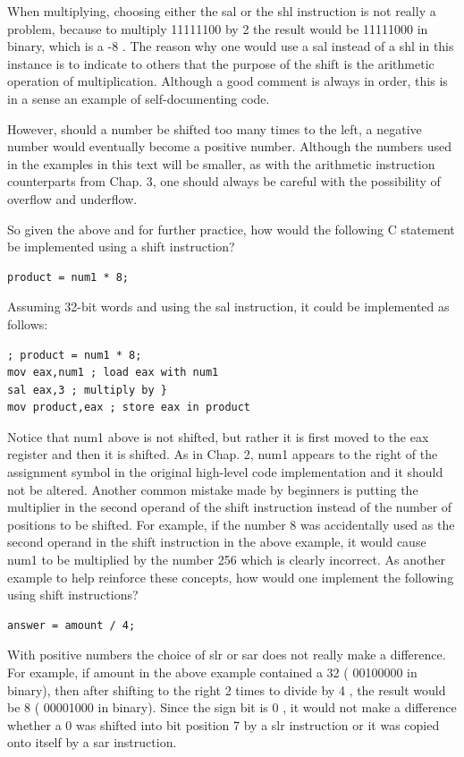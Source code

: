 \documentclass[10pt]{book}
\begin{document}
When multiplying, choosing either the sal or the shl instruction is not really a problem, because to multiply 11111100 by 2 the result would be 11111000 in binary, which is a -8 . The reason why one would use a sal instead of a shl in this instance is to indicate to others that the purpose of the shift is the arithmetic operation of multiplication. Although a good comment is always in order, this is in a sense an example of self-documenting code.

However, should a number be shifted too many times to the left, a negative number would eventually become a positive number. Although the numbers used in the examples in this text will be smaller, as with the arithmetic instruction counterparts from Chap. 3, one should always be careful with the possibility of overflow and underflow.

So given the above and for further practice, how would the following C statement be implemented using a shift instruction?

\begin{verbatim}
product = num1 * 8;
\end{verbatim}

Assuming 32-bit words and using the sal instruction, it could be implemented as follows:

\begin{verbatim}
; product = num1 * 8;
mov eax,num1 ; load eax with num1
sal eax,3 ; multiply by }
mov product,eax ; store eax in product
\end{verbatim}

Notice that num1 above is not shifted, but rather it is first moved to the eax register and then it is shifted. As in Chap. 2, num1 appears to the right of the assignment symbol in the original high-level code implementation and it should not be altered. Another common mistake made by beginners is putting the multiplier in the second operand of the shift instruction instead of the number of positions to be shifted. For example, if the number 8 was accidentally used as the second operand in the shift instruction in the above example, it would cause num1 to be multiplied by the number 256 which is clearly incorrect. As another example to help reinforce these concepts, how would one implement the following using shift instructions?

\begin{verbatim}
answer = amount / 4;
\end{verbatim}

With positive numbers the choice of slr or sar does not really make a difference. For example, if amount in the above example contained a 32 ( 00100000 in binary), then after shifting to the right 2 times to divide by 4 , the result would be 8 ( 00001000 in binary). Since the sign bit is 0 , it would not make a difference whether a 0 was shifted into bit position 7 by a slr instruction or it was copied onto itself by a sar instruction.
\end{document}
